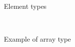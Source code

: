 \documentclass[10pt,journal,compsoc]{joser1}
\begin{document}
\begin{figure}[htbp]
   \begin{center}
     \\
     \caption{Element types\label{fig:types}}
   \end{center}
\end{figure}


\begin{figure}[htbp]
   \begin{center}
     \\
     \caption{Example of array type\label{fig:image}}
   \end{center}
\end{figure}
\end{document}
